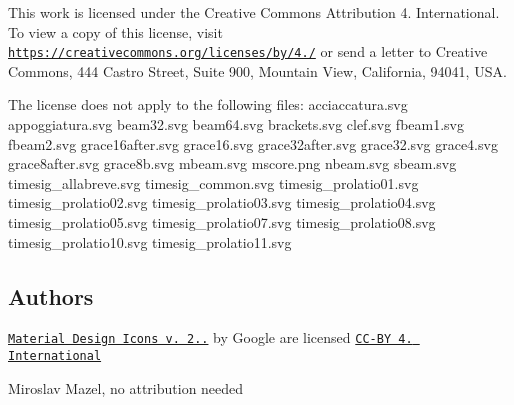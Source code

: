 This work is licensed under the Creative Commons Attribution 4. International. To view a copy of this license, visit \href{https://creativecommons.org/licenses/by/4.0/}{\tt https\+://creativecommons.\+org/licenses/by/4./} or send a letter to Creative Commons, 444 Castro Street, Suite 900, Mountain View, California, 94041, U\+SA.

The license does not apply to the following files\+: acciaccatura.\+svg appoggiatura.\+svg beam32.\+svg beam64.\+svg brackets.\+svg clef.\+svg fbeam1.\+svg fbeam2.\+svg grace16after.\+svg grace16.\+svg grace32after.\+svg grace32.\+svg grace4.\+svg grace8after.\+svg grace8b.\+svg mbeam.\+svg mscore.\+png nbeam.\+svg sbeam.\+svg timesig\+\_\+allabreve.\+svg timesig\+\_\+common.\+svg timesig\+\_\+prolatio01.\+svg timesig\+\_\+prolatio02.\+svg timesig\+\_\+prolatio03.\+svg timesig\+\_\+prolatio04.\+svg timesig\+\_\+prolatio05.\+svg timesig\+\_\+prolatio07.\+svg timesig\+\_\+prolatio08.\+svg timesig\+\_\+prolatio10.\+svg timesig\+\_\+prolatio11.\+svg

\subsection*{Authors }

\href{(https://github.com/google/material-design-icons/archive/2.2.3.zip)}{\tt Material Design Icons v. 2..} by Google are licensed \href{https://creativecommons.org/licenses/by/4.0/}{\tt C\+C-\/\+BY 4. International}

Miroslav Mazel, no attribution needed 